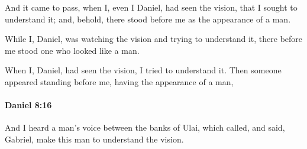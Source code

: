 			\begin{versebox}
					\item[BHS] 
					\item[LXX] 
					\item[ASV] And it came to pass, when I, even I Daniel, had seen the vision, that I sought to understand it; and, behold, there stood before me as the appearance of a man.
					\item[NIV] While I, Daniel, was watching the vision and trying to understand it, there before me stood one who looked like a man.
					\item[NRSV] When I, Daniel, had seen the vision, I tried to understand it. Then someone appeared standing before me, having the appearance of a man,
			\end{versebox}

		\paragraph{Daniel 8:16} %
			\label{DANIEL-8-16}

			And I heard a man’s voice between the banks of Ulai, which called, and said, Gabriel, make this man to understand the vision.


